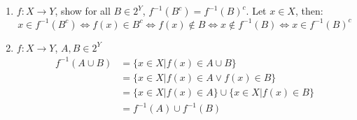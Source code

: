 \begin{enumerate}[resume*]
\begin{ungradedsolution}
\begin{enumerate}
            \item $f: X \to Y$, show for all $B \in 2^Y$, $f^{-1}(B^c)=f^{-1}(B)^c$. Let $x \in X$, then:
            \[
                x \in f^{-1}(B^c) \Leftrightarrow f(x) \in B^c \Leftrightarrow f(x) \not \in B \Leftrightarrow x \not \in f^{-1}(B) \Leftrightarrow x \in f^{-1}(B)^c
            \]
            \item $f: X \to Y$, $A,B \in 2^Y$
            \begin{align*}
                f^{-1}(A \cup B)
                 & = \{x \in X | f(x) \in A \cup B\}                        \\
                 & = \{x \in X | f(x) \in A \vee f(x) \in B\}               \\
                 & = \{x \in X | f(x) \in A\} \cup \{x \in X | f(x) \in B\} \\
                 & = f^{-1}(A) \cup f^{-1}(B)
            \end{align*}
        \end{enumerate}
    \end{ungradedsolution}


\end{enumerate}
